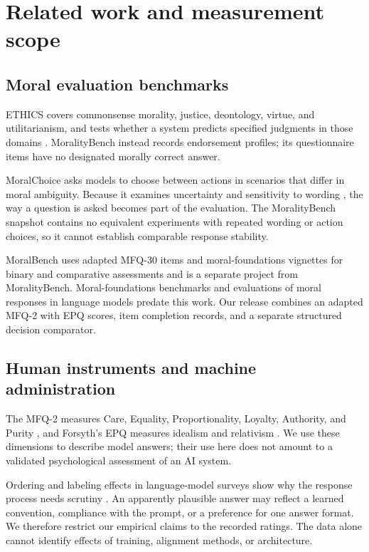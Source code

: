 \documentclass[11pt]{article}
\begin{document}
\section{Related work and measurement scope}
\subsection{Moral evaluation benchmarks}
ETHICS covers commonsense morality, justice, deontology, virtue, and utilitarianism, and tests whether a system predicts specified judgments in those domains \cite{hendrycks}. MoralityBench instead records endorsement profiles; its questionnaire items have no designated morally correct answer.

MoralChoice asks models to choose between actions in scenarios that differ in moral ambiguity. Because it examines uncertainty and sensitivity to wording \cite{scherrer}, the way a question is asked becomes part of the evaluation. The MoralityBench snapshot contains no equivalent experiments with repeated wording or action choices, so it cannot establish comparable response stability.

MoralBench uses adapted MFQ-30 items and moral-foundations vignettes for binary and comparative assessments \cite{ji} and is a separate project from MoralityBench. Moral-foundations benchmarks and evaluations of moral responses in language models predate this work. Our release combines an adapted MFQ-2 with EPQ scores, item completion records, and a separate structured decision comparator.

\subsection{Human instruments and machine administration}
The MFQ-2 measures Care, Equality, Proportionality, Loyalty, Authority, and Purity \cite{atari}, and Forsyth's EPQ measures idealism and relativism \cite{forsyth}. We use these dimensions to describe model answers; their use here does not amount to a validated psychological assessment of an AI system.

Ordering and labeling effects in language-model surveys show why the response process needs scrutiny \cite{dominguez}. An apparently plausible answer may reflect a learned convention, compliance with the prompt, or a preference for one answer format. We therefore restrict our empirical claims to the recorded ratings. The data alone cannot identify effects of training, alignment methods, or architecture.
\end{document}

